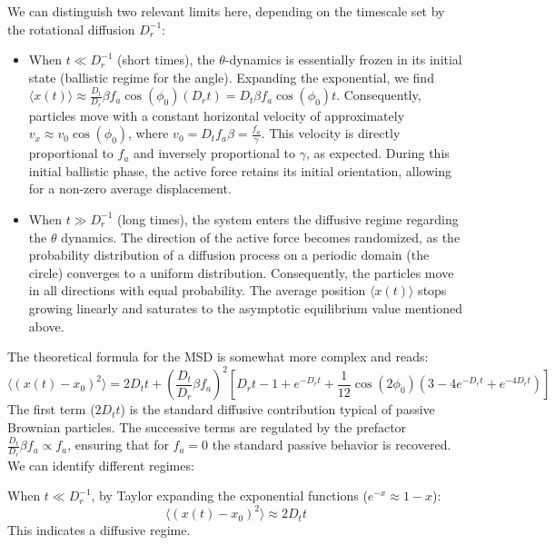 We can distinguish two relevant limits here, depending on the timescale set by the rotational diffusion $D_r^{-1}$:
\begin{itemize}
\item When $t \ll D_r^{-1}$ (short times), the $\theta$-dynamics is essentially frozen in its initial state (ballistic regime for the angle). Expanding the exponential, we find $\langle x(t)\rangle \approx \frac{D_t}{D_r} \beta f_a \cos(\phi_0) (D_r t) = D_t \beta f_a \cos(\phi_0) t$. 
Consequently, particles move with a constant horizontal velocity of approximately $v_x \approx v_0 \cos(\phi_0)$, where $v_0 = D_t f_a \beta = \frac{f_a}{\gamma}$. This velocity is directly proportional to $f_a$ and inversely proportional to $\gamma$, as expected. During this initial ballistic phase, the active force retains its initial orientation, allowing for a non-zero average displacement.

\item When $t \gg D_r^{-1}$ (long times), the system enters the diffusive regime regarding the $\theta$ dynamics. The direction of the active force becomes randomized, as the probability distribution of a diffusion process on a periodic domain (the circle) converges to a uniform distribution. Consequently, the particles move in all directions with equal probability. The average position $\langle x(t) \rangle$ stops growing linearly and saturates to the asymptotic equilibrium value mentioned above.
\end{itemize}

The theoretical formula for the MSD is somewhat more complex and reads:
\begin{equation}
\langle (x(t)-x_0)^2\rangle = 2D_t t + \left(\frac{D_t}{D_r}\beta f_a\right)^2 \left[ D_r t -1+ e^{-D_r t} + \frac{1}{12}\cos(2\phi_0) \left(3-4e^{-D_r t}+e^{-4D_r t}\right) \right]
\end{equation}
The first term ($2D_t t$) is the standard diffusive contribution typical of passive Brownian particles. The successive terms are regulated by the prefactor $\frac{D_t}{D_r} \beta f_a \propto f_a$, ensuring that for $f_a = 0$ the standard passive behavior is recovered. We can identify different regimes:

When $t \ll D_r^{-1}$, by Taylor expanding the exponential functions ($e^{-x} \approx 1 - x$):
\begin{equation}
\langle (x(t)-x_0)^2\rangle \approx 2D_t t
\end{equation}
This indicates a diffusive regime.


